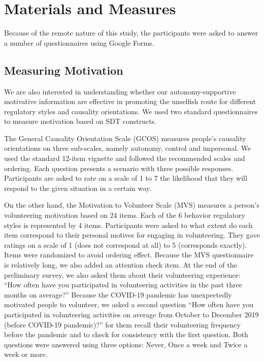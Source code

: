 \section{Materials and Measures}
Because of the remote nature of this study, the participants were asked to answer a number of questionnaires using Google Forms.

\subsection{Measuring Motivation}
We are also interested in understanding whether our autonomy-supportive motivative information are effective in promoting the unselfish route for different regulatory styles and causality orientations. We used two standard questionnaires to measure motivation based on SDT constructs. 

The General Causality Orientation Scale (GCOS)\cite{Deci1985GCOS} measures people's causality orientations on three sub-scales, namely autonomy, control and impersonal. We used the standard 12-item vignette and followed the recommended scales and ordering. Each question presents a scenario with three possible responses. Participants are asked to rate on a scale of 1 to 7 the likelihood that they will respond to the given situation in a certain way. 

On the other hand, the Motivation to Volunteer Scale (MVS)\cite{grano2008motives} measures a person's volunteering motivation based on 24 items. Each of the 6 behavior regulatory styles is represented by 4 items. Participants were asked to what extent do each item correspond to their personal motives for engaging in volunteering. They gave ratings on a scale of 1 (does not correspond at all) to 5 (corresponds exactly). Items were randomized to avoid ordering effect. Because the MVS questionnaire is relatively long, we also added an attention check item. At the end of the preliminary survey, we also asked them about their volunteering experience: ``How often have you participated in volunteering activities in the past three months on average?'' Because the COVID-19 pandemic has unexpectedly motivated people to volunteer, we asked a second question ``How often have you participated in volunteering activities on average from October to December 2019 (before COVID-19 pandemic)?'' for them recall their volunteering frequency before the pandemic and to check for consistency with the first question. Both questions were answered using three options: Never, Once a week and Twice a week or more.


